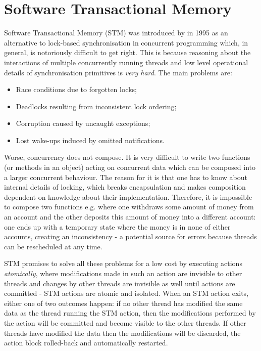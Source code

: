 \section{Software Transactional Memory}
Software Transactional Memory (STM) was introduced by \cite{shavit_software_1995} in 1995 as an alternative to lock-based synchronisation in concurrent programming which, in general, is notoriously difficult to get right. This is because reasoning about the interactions of multiple concurrently running threads and low level operational details of synchronisation primitives is \textit{very hard}. The main problems are:

\begin{itemize}
	\item Race conditions due to forgotten locks;
	\item Deadlocks resulting from inconsistent lock ordering;
	\item Corruption caused by uncaught exceptions;
	\item Lost wake-ups induced by omitted notifications.
\end{itemize}

Worse, concurrency does not compose. It is very difficult to write two functions (or methods in an object) acting on concurrent data which can be composed into a larger concurrent behaviour. The reason for it is that one has to know about internal details of locking, which breaks encapsulation and makes composition dependent on knowledge about their implementation. Therefore, it is impossible to compose two  functions e.g. where one withdraws some amount of money from an account and the other deposits this amount of money into a different account: one ends up with a temporary state where the money is in none of either accounts, creating an inconsistency - a potential source for errors because threads can be rescheduled at any time.

STM promises to solve all these problems for a low cost by executing actions \textit{atomically}, where modifications made in such an action are invisible to other threads and changes by other threads are invisible as well until actions are committed - STM actions are atomic and isolated. When an STM action exits, either one of two outcomes happen: if no other thread has modified the same data as the thread running the STM action, then the modifications performed by the action will be committed and become visible to the other threads. If other threads have modified the data then the modifications will be discarded, the action block rolled-back and automatically restarted.

